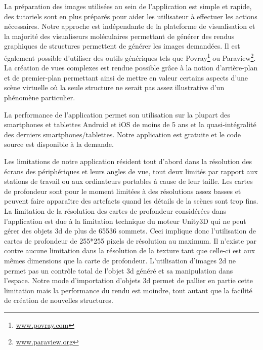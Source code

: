 La préparation des images utilisées au sein de l'application est simple et rapide, des tutoriels sont en plus préparés pour aider les utilisateur à effectuer les actions nécessaires. Notre approche est indépendante de la plateforme de visualisation et la majorité des visualiseurs moléculaires permettant de générer des rendus graphiques de structures permettent de générer les images demandées. Il est également possible d'utiliser des outils génériques tels que Povray\footnote{\url{www.povray.com}} ou Paraview\footnote{\url{www.paraview.org}}. La création de vues complexes est rendue possible grâce à la notion d'arrière-plan et de premier-plan permettant ainsi de mettre en valeur certains aspects d'une scène virtuelle où la seule structure ne serait pas assez illustrative d'un phénomène particulier.

La performance de l'application permet son utilisation sur la plupart des smartphones et tablettes Android et iOS de moins de 5 ans et la quasi-intégralité des derniers smartphones/tablettes. Notre application est gratuite et le code source est disponible à la demande.

Les limitations de notre application résident tout d'abord dans la résolution des écrans des périphériques et leurs angles de vue, tout deux limités par rapport aux stations de travail ou aux ordinateurs portables à cause de leur taille. Les cartes de profondeur sont pour le moment limitées à des résolutions assez basses et peuvent faire apparaître des artefacts quand les détails de la scènes sont trop fins. La limitation de la résolution des cartes de profondeur considérées dans l'application est due à la limitation technique du moteur Unity3D qui ne peut gérer des objets 3d de plus de 65536 sommets. Ceci implique donc l'utilisation de cartes de profondeur de 255*255 pixels de résolution au maximum. Il n'existe par contre aucune limitation dans la résolution de la texture tant que celle-ci est aux mêmes dimensions que la carte de profondeur. L'utilisation d'images 2d ne permet pas un contrôle total de l'objet 3d généré et sa manipulation dans l'espace. Notre mode d'importation d'objets 3d permet de pallier en partie cette limitation mais la performance du rendu est moindre, tout autant que la facilité de création de nouvelles structures.






